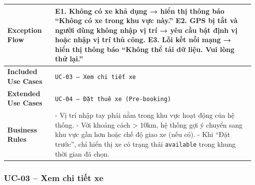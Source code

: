\begin{longtable}{|>{\raggedright\arraybackslash}p{4cm}|>{\raggedright\arraybackslash}p{11cm}|}
\hline
\textbf{Exception Flow} & 
E1. Không có xe khả dụng → hiển thị thông báo ``Không có xe trong khu vực này.'' \newline
E2. GPS bị tắt và người dùng không nhập vị trí → yêu cầu bật định vị hoặc nhập vị trí thủ công. \newline
E3. Lỗi kết nối mạng → hiển thị thông báo ``Không thể tải dữ liệu. Vui lòng thử lại.'' \\
\hline
\textbf{Included Use Cases} & \texttt{UC-03 -- Xem chi tiết xe} \\
\hline
\textbf{Extended Use Cases} & \texttt{UC-04 -- Đặt thuê xe (Pre-booking)} \\
\hline
\textbf{Business Rules} &
- Vị trí nhập tay phải nằm trong khu vực hoạt động của hệ thống. \newline
- Với khoảng cách > 10km, hệ thống gợi ý chuyển sang khu vực gần hơn hoặc chế độ giao xe (nếu có). \newline
- Khi ``Đặt trước'', chỉ hiển thị xe có trạng thái \texttt{available} trong khung thời gian đã chọn. \\
\hline
\end{longtable}

\subsubsection*{UC-03 – Xem chi tiết xe}

